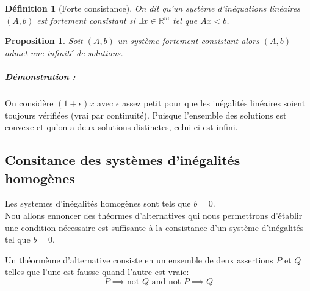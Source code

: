 \documentclass[10pt,a4paper]{article}
\newtheorem{mydef}{Définition}
\newtheorem{prop}{Proposition}
\begin{document}
\begin{mydef}[Forte consistance]
On dit qu'un système d'inéquations linéaires $(A,b)$ est fortement consistant si $\exists x \in \mathbb{R}^m$ tel que $Ax < b$.
\end{mydef}

\begin{prop}
Soit $(A,b)$ un système fortement consistant alors $(A,b)$ admet une infinité de solutions.
\end{prop}
\subparagraph{Démonstration :} On considère $(1+\epsilon) x$ avec $\epsilon$ assez petit pour que les inégalités linéaires soient toujours vérifiées (vrai par continuité).
Puisque l'ensemble des solutions est convexe et qu'on a deux solutions distinctes, celui-ci est infini.

\subsection{Consitance des systèmes d'inégalités homogènes}
Les systemes d'inégalités homogènes sont tels que $b=0$.\\

Nou allons ennoncer des théormes d'alternatives qui nous permettrons d'établir une condition nécessaire est suffisante à la consistance d'un système d'inégalités tel que $b=0$.

Un théormème d'alternative consiste en un ensemble de deux assertions $P$ et $Q$ telles que l'une est fausse quand l'autre est vraie:
\[ P \implies \text{not } Q \text{ and } \text{not } P \implies Q \]
\end{document}
